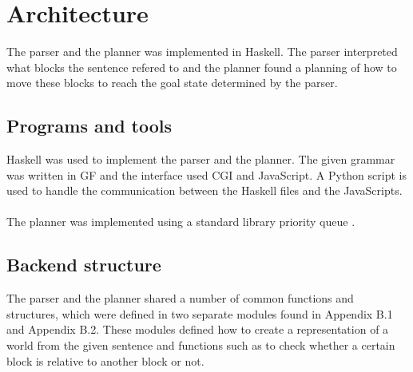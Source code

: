 \chapter{Architecture}
The parser and the planner was implemented in Haskell. The parser interpreted
what blocks the sentence refered to and the planner found a planning of how to
move these blocks to reach the goal state determined by the parser. 

\section{Programs and tools}
Haskell was used to implement the parser and the planner. The given grammar was
written in GF and the interface used CGI and JavaScript. A Python script is
used to handle the communication between the Haskell files and the JavaScripts.
\\\\
The planner was implemented using a standard library priority queue \citep{psq_url}. 

\section{Backend structure}
The parser and the planner shared a number of common functions and structures,
which were defined in two separate modules found in Appendix B.1 and Appendix
B.2. These modules defined how to create a representation of a world from the
given sentence and functions such as to check whether a certain block is
relative to another block or not. 

